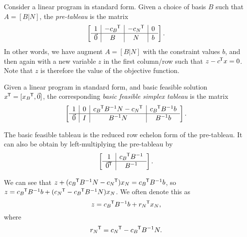 \begin{defn}
    Consider a linear program in standard form. Given a choice of basis $B$ such that $A = [B | N]$, the \emph{pre-tableau} is the matrix
    \begin{align*}
        \left[\begin{array}{c|c|c|c}
            1 & -{c_B}^{\mkern-1.5mu\mathsf{T}} & -{c_N}^{\mkern-1.5mu\mathsf{T}} & 0 \\
            \hline
            \vec{0} & B & N & b
        \end{array}\right].
    \end{align*}
    In other words, we have augment $A = [B|N]$ with the constraint values $b$, and then again with a new variable $z$ in the first column/row such that $z - {c}^{\mkern-1.5mu\mathsf{T}}x = 0$. Note that $z$ is therefore the value of the objective function.
\end{defn}

\begin{defn}
    Given a linear program in standard form, and basic feasible solution ${x}^{\mkern-1.5mu\mathsf{T}} = [{x_B}^{\mkern-1.5mu\mathsf{T}}, \vec{0}]$, the corresponding \emph{basic feasible simplex tableau} is the matrix
    \begin{align*}
        \left[\begin{array}{c|c|c|c}
            1 & 0 & {c_B}^{\mkern-1.5mu\mathsf{T}}B^{-1}N-{c_N}^{\mkern-1.5mu\mathsf{T}} & {c_B}^{\mkern-1.5mu\mathsf{T}}B^{-1}b \\
            \hline
            \vec{0} & I & B^{-1}N & B^{-1}b
        \end{array}\right].
    \end{align*}
\end{defn}

\begin{rmk}
    The basic feasible tableau is the reduced row echelon form of the pre-tableau. It can also be obtain by left-multiplying the pre-tableau by
    \begin{align*}
        \left[\begin{array}{c|c}
            1 & {c_B}^{\mkern-1.5mu\mathsf{T}}B^{-1} \\
            \hline
            {\vec{0}}^{\mkern-1.5mu\mathsf{T}} & B^{-1}
        \end{array}\right].
    \end{align*}
\end{rmk}

\begin{rmk}
    We can see that $z + ({c_B}^{\mkern-1.5mu\mathsf{T}}B^{-1}N-{c_N}^{\mkern-1.5mu\mathsf{T}})x_N = {c_B}^{\mkern-1.5mu\mathsf{T}}B^{-1}b$, so $z = {c_B}^{\mkern-1.5mu\mathsf{T}}B^{-1}b + ({c_N}^{\mkern-1.5mu\mathsf{T}} - {c_B}^{\mkern-1.5mu\mathsf{T}}B^{-1}N)x_N$. We often denote this as
    \[z = {c_B}^{\mkern-1.5mu\mathsf{T}}B^{-1}b + {r_N}^{\mkern-1.5mu\mathsf{T}}x_N,\]
    where
    \[{r_N}^{\mkern-1.5mu\mathsf{T}} = {c_N}^{\mkern-1.5mu\mathsf{T}} - {c_B}^{\mkern-1.5mu\mathsf{T}}B^{-1}N.\]
\end{rmk}

